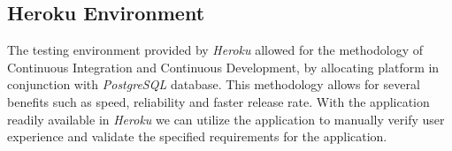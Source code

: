 \subsection{Heroku Environment}
The testing environment provided by \textit{Heroku} allowed for the methodology of Continuous Integration and Continuous Development, by allocating platform in conjunction with \textit{PostgreSQL} database. This methodology allows for several benefits such as speed, reliability and faster release rate. With the application readily available in \textit{Heroku} we can utilize the application to manually verify user experience and validate the specified requirements for the application.
